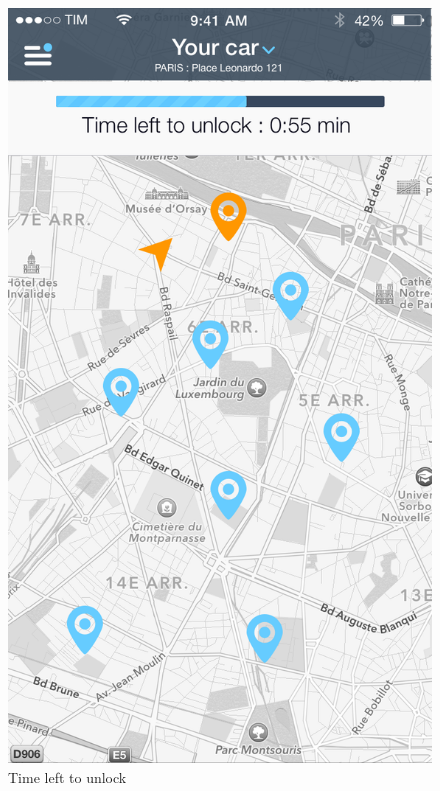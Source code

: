 \documentclass[12pt]{article}
\begin{document}
\begin{figure}
 	 	  \includegraphics[scale=0.25]{Images/mobileApp/TimeLeft.png}
		  \caption{Time left to unlock}
		  \endminipage
 	 	\end{figure}
 	 	\clearpage
 	 	
\end{document}
